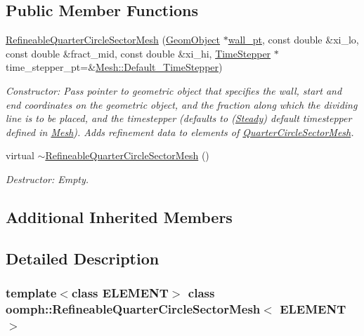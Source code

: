 \subsection*{Public Member Functions}
\begin{DoxyCompactItemize}
\item 
\hyperlink{classoomph_1_1RefineableQuarterCircleSectorMesh_a07b183ff3e548456e67b92b6fce41cde}{Refineable\+Quarter\+Circle\+Sector\+Mesh} (\hyperlink{classoomph_1_1GeomObject}{Geom\+Object} $\ast$\hyperlink{classoomph_1_1QuarterCircleSectorMesh_a0b03071bbe7e95cc6723c221ddc0998a}{wall\+\_\+pt}, const double \&xi\+\_\+lo, const double \&fract\+\_\+mid, const double \&xi\+\_\+hi, \hyperlink{classoomph_1_1TimeStepper}{Time\+Stepper} $\ast$time\+\_\+stepper\+\_\+pt=\&\hyperlink{classoomph_1_1Mesh_a12243d0fee2b1fcee729ee5a4777ea10}{Mesh\+::\+Default\+\_\+\+Time\+Stepper})
\begin{DoxyCompactList}\small\item\em Constructor\+: Pass pointer to geometric object that specifies the wall, start and end coordinates on the geometric object, and the fraction along which the dividing line is to be placed, and the timestepper (defaults to (\hyperlink{classoomph_1_1Steady}{Steady}) default timestepper defined in \hyperlink{classoomph_1_1Mesh}{Mesh}). Adds refinement data to elements of \hyperlink{classoomph_1_1QuarterCircleSectorMesh}{Quarter\+Circle\+Sector\+Mesh}. \end{DoxyCompactList}\item 
virtual \hyperlink{classoomph_1_1RefineableQuarterCircleSectorMesh_abf958060ab5ea27a2ca079cba58af8f5}{$\sim$\+Refineable\+Quarter\+Circle\+Sector\+Mesh} ()
\begin{DoxyCompactList}\small\item\em Destructor\+: Empty. \end{DoxyCompactList}\end{DoxyCompactItemize}
\subsection*{Additional Inherited Members}


\subsection{Detailed Description}
\subsubsection*{template$<$class E\+L\+E\+M\+E\+NT$>$\newline
class oomph\+::\+Refineable\+Quarter\+Circle\+Sector\+Mesh$<$ E\+L\+E\+M\+E\+N\+T $>$}

